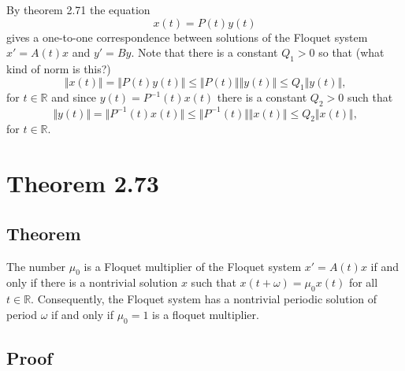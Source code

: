 \documentclass[a4paper]{article}
\begin{document}
By theorem 2.71 the equation 
\begin{equation*}
    x(t) = P(t)y(t)
\end{equation*}
gives a one-to-one correspondence between solutions of the Floquet system $x' = A(t)x$ and $y' = By$. Note that there is a constant $Q_1 > 0$ so that (what kind of norm is this?) 
\begin{equation*}
    \Vert x(t) \Vert = \Vert P(t)y(t) \Vert \leq \Vert P(t) \Vert \Vert y(t) \Vert  \leq Q_{1} \Vert y(t) \Vert \text{,}
\end{equation*}
for $t \in \mathbb{R}$ and since $y(t) = P^{-1}(t)x(t)$ there is a constant $Q_2 > 0$ such that 
\begin{equation*}
    \Vert y(t) \Vert = \Vert P^{-1}(t)x(t) \Vert \leq \Vert P^{-1}(t) \Vert \Vert x(t) \Vert  \leq Q_{2} \Vert x(t) \Vert \text{,}
\end{equation*}
for $t \in \mathbb{R}$.

\section{Theorem 2.73}

\subsection{Theorem}

The number $\mu_0$ is a Floquet multiplier of the Floquet system $x' = A(t)x$ if and only if there is a nontrivial solution $x$ such that $x(t + \omega) = \mu_0 x(t)$ for all $t \in \mathbb{R}$. Consequently, the Floquet system has a nontrivial periodic solution of period $\omega$ if and only if $\mu_0 = 1$ is a floquet multiplier.

\subsection{Proof}
\end{document}
